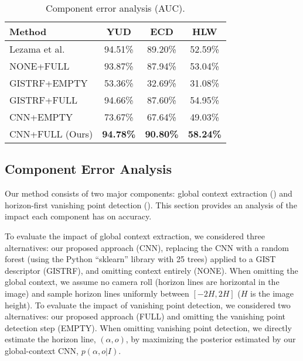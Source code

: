 \begin{table}[t] \centering
  \caption{Component error analysis (AUC).}
  \vspace{-.5em}
  \begin{tabular}{|l|c|c|c|}
    \hline
    Method & YUD & ECD & HLW \\
    \hline
    \hline
    Lezama et al.~\cite{alignment2014} & 94.51\% & 89.20\% & 52.59\% \\
    \hline
    NONE+FULL & 93.87\% & 87.94\% & 53.04\% \\
    \hline
    GISTRF+EMPTY & 53.36\% &  32.69\% & 31.08\% \\
    GISTRF+FULL & 94.66\% &  87.60\% & 54.95\% \\
    \hline
    CNN+EMPTY & 73.67\% &  67.64\% & 49.03\% \\
    CNN+FULL (Ours) & \textbf{94.78\%} & \textbf{90.80\%} & \textbf{58.24\%} \\
    \hline
  \end{tabular}
  \label{tbl:contribution}
\end{table}

\subsection{Component Error Analysis}
\label{sec:analysis}

Our method consists of two major components: global context extraction
() and horizon-first vanishing point detection
(). This section provides an analysis of the impact
each component has on accuracy. 

To evaluate the impact of global context extraction, we considered
three alternatives: our proposed approach (CNN), replacing the CNN
with a random forest (using the Python ``sklearn'' library with 25 trees) applied to a GIST~\cite{oliva2001modeling}
descriptor (GISTRF), and omitting context entirely
(NONE). When omitting the global context, we assume no camera
roll (horizon lines are horizontal in the image) and sample horizon
lines uniformly between $[-2H,2H]$ ($H$ is the image height).  To
evaluate the impact of vanishing point detection, we considered two
alternatives: our proposed approach (FULL) and omitting the vanishing
point detection step (EMPTY). When omitting vanishing point detection,
we directly estimate the horizon line, $(\alpha, o)$, by maximizing
the posterior estimated by our global-context CNN, $p(\alpha, o | I)$.

